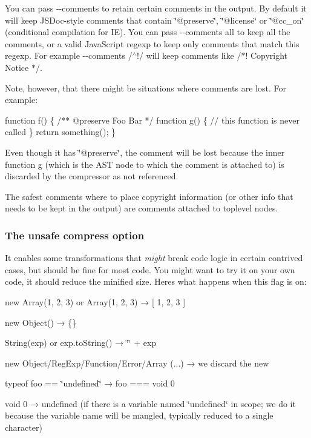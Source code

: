You can pass {\ttfamily -\/-\/comments} to retain certain comments in the output. By default it will keep J\+S\+Doc-\/style comments that contain \char`\"{}@preserve\char`\"{}, \char`\"{}@license\char`\"{} or \char`\"{}@cc\+\_\+on\char`\"{} (conditional compilation for IE). You can pass {\ttfamily -\/-\/comments all} to keep all the comments, or a valid Java\+Script regexp to keep only comments that match this regexp. For example {\ttfamily -\/-\/comments /$^\wedge$!/} will keep comments like {\ttfamily /$\ast$! Copyright Notice $\ast$/}.

Note, however, that there might be situations where comments are lost. For example\+: 
\begin{DoxyCode}
function f() \{
    /** @preserve Foo Bar */
    function g() \{
        // this function is never called
    \}
    return something();
\}
\end{DoxyCode}


Even though it has \char`\"{}@preserve\char`\"{}, the comment will be lost because the inner function {\ttfamily g} (which is the A\+ST node to which the comment is attached to) is discarded by the compressor as not referenced.

The safest comments where to place copyright information (or other info that needs to be kept in the output) are comments attached to toplevel nodes.

\subsubsection*{The {\ttfamily unsafe} {\ttfamily compress} option}

It enables some transformations that {\itshape might} break code logic in certain contrived cases, but should be fine for most code. You might want to try it on your own code, it should reduce the minified size. Here\textquotesingle{}s what happens when this flag is on\+:


\begin{DoxyItemize}
\item {\ttfamily new Array(1, 2, 3)} or {\ttfamily Array(1, 2, 3)} → {\ttfamily \mbox{[} 1, 2, 3 \mbox{]}}
\item {\ttfamily new Object()} → {\ttfamily \{\}}
\item {\ttfamily String(exp)} or {\ttfamily exp.\+to\+String()} → {\ttfamily \char`\"{}\char`\"{} + exp}
\item {\ttfamily new Object/\+Reg\+Exp/\+Function/\+Error/\+Array (...)} → we discard the {\ttfamily new}
\item {\ttfamily typeof foo == \char`\"{}undefined\char`\"{}} → {\ttfamily foo === void 0}
\item {\ttfamily void 0} → {\ttfamily undefined} (if there is a variable named \char`\"{}undefined\char`\"{} in scope; we do it because the variable name will be mangled, typically reduced to a single character)
\end{DoxyItemize}

